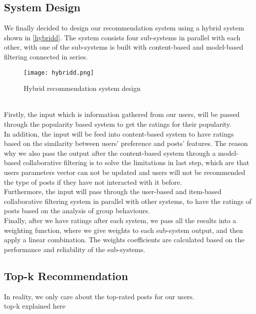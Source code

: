 \subsection{System Design}
We finally decided to design our recommendation system using a hybrid system shown in \autoref{hybridd}. The system consists four sub-systems in parallel with each other, 
with one of the sub-systems is built with content-based and model-based filtering connected in series.
\begin{figure}[ht]
    \centering
    \texttt{[image: hybridd.png]}
    \caption{Hybrid recommendation system design}
    \label{hybridd}
    \end{figure}
\\Firstly, the input which is information gathered from our users, will be passed through the popularity based system to get the ratings for their popularity.
\\In addition, the input will be feed into content-based system to have ratings based on the similarity between users' preference and posts' features. 
The reason why we also pass the output after the content-based system through a model-based collaborative filtering is to solve the limitations in last step, 
which are that users parameters vector can not be updated and users will not be recommended the type of posts if they have not interacted with it before.
\\Furthermore, the input will pass through the user-based and item-based collaborative filtering system in parallel with other systems, 
to have the ratings of posts based on the analysis of group behaviours.
\\Finally, after we have ratings after each system, we pass all the results into a weighting function, where we give weights to each sub-system output, and then apply a linear combination.
The weights coefficients are calculated based on the performance and reliability of the sub-systems.

\subsection{Top-k Recommendation}
\label{Top-k Recommendation}
In reality, we only care about the top-rated posts for our users. 
\\top-k explained here




